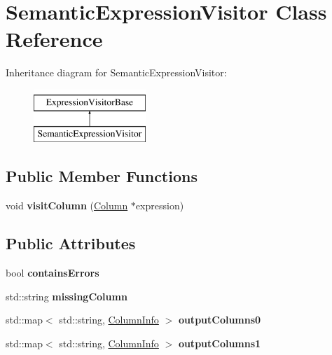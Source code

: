 \hypertarget{class_semantic_expression_visitor}{\section{Semantic\+Expression\+Visitor Class Reference}
\label{class_semantic_expression_visitor}
}
Inheritance diagram for Semantic\+Expression\+Visitor\+:\begin{figure}[H]
\begin{center}
\leavevmode
\includegraphics[height=2.000000cm]{class_semantic_expression_visitor}
\end{center}
\end{figure}
\subsection*{Public Member Functions}
\begin{DoxyCompactItemize}
\item 
\hypertarget{class_semantic_expression_visitor_a5a669aa8f4ff78ca0bfd3aab0a4d11d9}{void {\bfseries visit\+Column} (\hyperlink{class_column}{Column} $\ast$expression)}\label{class_semantic_expression_visitor_a5a669aa8f4ff78ca0bfd3aab0a4d11d9}

\end{DoxyCompactItemize}
\subsection*{Public Attributes}
\begin{DoxyCompactItemize}
\item 
\hypertarget{class_semantic_expression_visitor_a5355c2bd3477b4d33bc7ab5443408d11}{bool {\bfseries contains\+Errors}}\label{class_semantic_expression_visitor_a5355c2bd3477b4d33bc7ab5443408d11}

\item 
\hypertarget{class_semantic_expression_visitor_a2082ef4052d1c35fdda7bcc72c5bb132}{std\+::string {\bfseries missing\+Column}}\label{class_semantic_expression_visitor_a2082ef4052d1c35fdda7bcc72c5bb132}

\item 
\hypertarget{class_semantic_expression_visitor_a38fc36443e4cabad8039ac58f9934780}{std\+::map$<$ std\+::string, \hyperlink{class_column_info}{Column\+Info} $>$ {\bfseries output\+Columns0}}\label{class_semantic_expression_visitor_a38fc36443e4cabad8039ac58f9934780}

\item 
\hypertarget{class_semantic_expression_visitor_aca4d42fbadc6310390ccdbe65a0356fd}{std\+::map$<$ std\+::string, \hyperlink{class_column_info}{Column\+Info} $>$ {\bfseries output\+Columns1}}\label{class_semantic_expression_visitor_aca4d42fbadc6310390ccdbe65a0356fd}

\end{DoxyCompactItemize}



